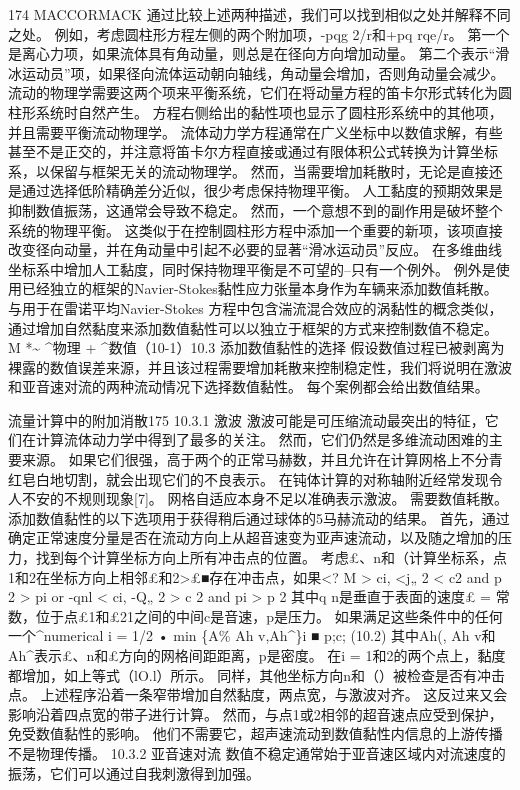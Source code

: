 \documentclass[UTF8,11pt,a4paper,openany,fontset=fandol]{ctexbook}
\begin{document}
174 MACCORMACK 通过比较上述两种描述，我们可以找到相似之处并解释不同之处。 例如，考虑圆柱形方程左侧的两个附加项，-pqg 2/r和+pq rqe/r。 第一个是离心力项，如果流体具有角动量，则总是在径向方向增加动量。 第二个表示“滑冰运动员”项，如果径向流体运动朝向轴线，角动量会增加，否则角动量会减少。 流动的物理学需要这两个项来平衡系统，它们在将动量方程的笛卡尔形式转化为圆柱形系统时自然产生。 方程右侧给出的黏性项也显示了圆柱形系统中的其他项，并且需要平衡流动物理学。 流体动力学方程通常在广义坐标中以数值求解，有些甚至不是正交的，并注意将笛卡尔方程直接或通过有限体积公式转换为计算坐标系，以保留与框架无关的流动物理学。 然而，当需要增加耗散时，无论是直接还是通过选择低阶精确差分近似，很少考虑保持物理平衡。 人工黏度的预期效果是抑制数值振荡，这通常会导致不稳定。 然而，一个意想不到的副作用是破坏整个系统的物理平衡。 这类似于在控制圆柱形方程中添加一个重要的新项，该项直接改变径向动量，并在角动量中引起不必要的显著“滑冰运动员”反应。 在多维曲线坐标系中增加人工黏度，同时保持物理平衡是不可望的--只有一个例外。 例外是使用已经独立的框架的Navier-Stokes黏性应力张量本身作为车辆来添加数值耗散。 与用于在雷诺平均Navier-Stokes 方程中包含湍流混合效应的涡黏性的概念类似，通过增加自然黏度来添加数值黏性可以以独立于框架的方式来控制数值不稳定。 M *\textasciitilde{} \textasciicircum{}物理 + \textasciicircum{}数值（10-1）10.3 添加数值黏性的选择 假设数值过程已被剥离为裸露的数值误差来源，并且该过程需要增加耗散来控制稳定性，我们将说明在激波和亚音速对流的两种流动情况下选择数值黏性。 每个案例都会给出数值结果。

流量计算中的附加消散175 10.3.1 激波 激波可能是可压缩流动最突出的特征，它们在计算流体动力学中得到了最多的关注。 然而，它们仍然是多维流动困难的主要来源。 如果它们很强，高于两个的正常马赫数，并且允许在计算网格上不分青红皂白地切割，就会出现它们的不良表示。 在钝体计算的对称轴附近经常发现令人不安的不规则现象[7]。 网格自适应本身不足以准确表示激波。 需要数值耗散。 添加数值黏性的以下选项用于获得稍后通过球体的5马赫流动的结果。 首先，通过确定正常速度分量是否在流动方向上从超音速变为亚声速流动，以及随之增加的压力，找到每个计算坐标方向上所有冲击点的位置。 考虑£、n和（计算坐标系，点1和2在坐标方向上相邻£和2>£■存在冲击点，如果<? M > ci, <j„ 2 < c2 and p 2 > pi or -qnl < ci, -Q„ 2 > c 2 and pi > p 2 其中q n是垂直于表面的速度£ = 常数，位于点£1和£21之间的中间c是音速，p是压力。 如果满足这些条件中的任何一个\textasciicircum{}numerical i = 1/2 • min \{A\% Ah v,Ah\textasciicircum{}\}i ■ p;c; (10.2) 其中Ah(, Ah v和Ah\textasciicircum{}表示£、n和£方向的网格间距距离，p是密度。 在i = 1和2的两个点上，黏度都增加，如上等式（lO.l）所示。 同样，其他坐标方向n和（）被检查是否有冲击点。 上述程序沿着一条窄带增加自然黏度，两点宽，与激波对齐。 这反过来又会影响沿着四点宽的带子进行计算。 然而，与点1或2相邻的超音速点应受到保护，免受数值黏性的影响。 他们不需要它，超声速流动到数值黏性内信息的上游传播不是物理传播。 10.3.2 亚音速对流 数值不稳定通常始于亚音速区域内对流速度的振荡，它们可以通过自我刺激得到加强。
\end{document}
